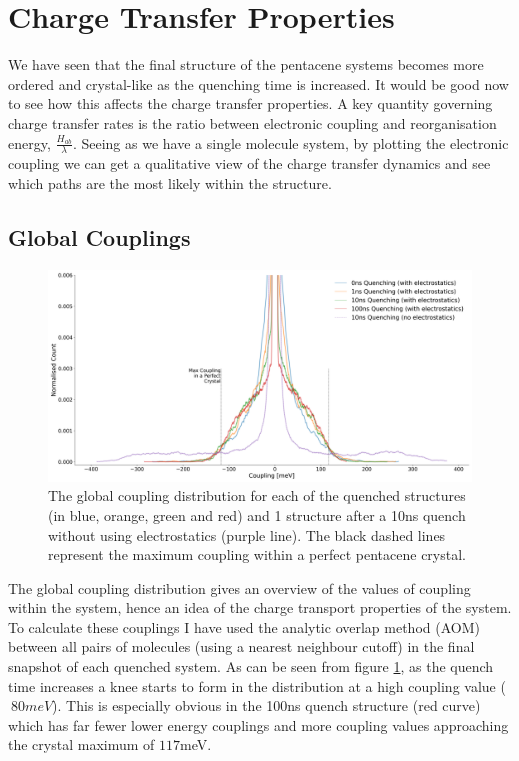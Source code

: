 \section{Charge Transfer Properties}
We have seen that the final structure of the pentacene systems becomes more ordered and crystal-like as the quenching time is increased. It would be good now to see how this affects the charge transfer properties. A key quantity governing charge transfer rates is the ratio between electronic coupling and reorganisation energy, $\frac{H_{ab}}{\lambda}$. Seeing as we have a single molecule system, by plotting the electronic coupling we can get a qualitative view of the charge transfer dynamics and see which paths are the most likely within the structure.
\subsection{Global Couplings}
\label{sect:GlobCoup}
\begin{figure}[ht]
	\includegraphics[width=\textwidth]{./img/DifferentQuenchTimes/GlobalCouplings.png}
	\caption{\label{fig:glob_coup}The global coupling distribution for each of the quenched structures (in blue, orange, green and red) and 1 structure after a 10ns quench without using electrostatics (purple line). The black dashed lines represent the maximum coupling within a perfect pentacene crystal.}
\end{figure}
\noindent The global coupling distribution gives an overview of the values of coupling within the system, hence an idea of the charge transport properties of the system. To calculate these couplings I have used the analytic overlap method (AOM)\cite{gajdos_ultrafast_2014} between all pairs of molecules (using a nearest neighbour cutoff) in the final snapshot of each quenched system. As can be seen from figure \ref{fig:glob_coup}, as the quench time increases a knee starts to form in the distribution at a high coupling value ($~80 meV$). This is especially obvious in the 100ns quench structure (red curve) which has far fewer lower energy couplings and more coupling values approaching the crystal maximum of $117$meV.
